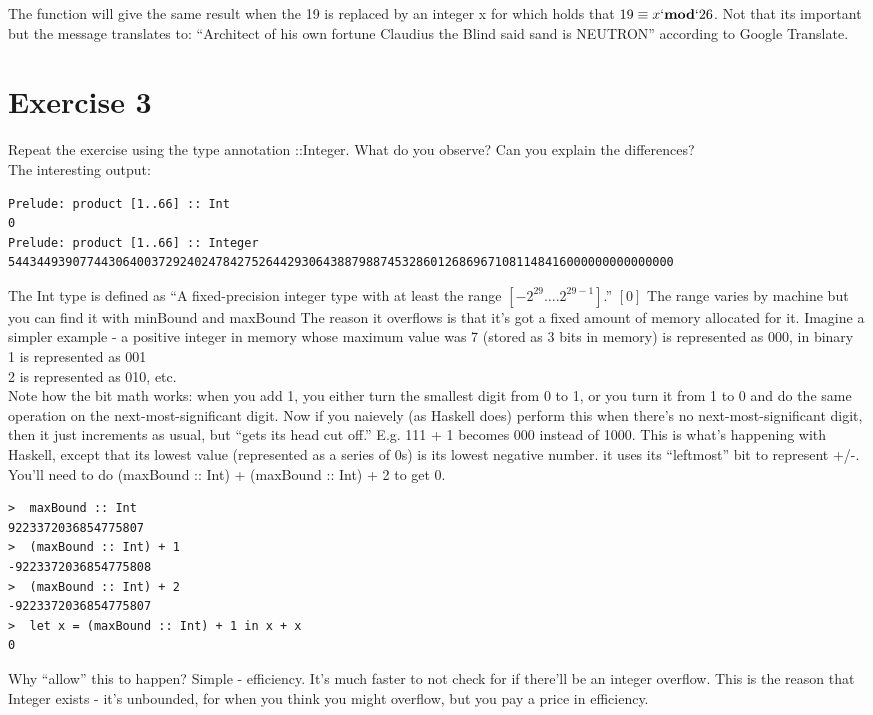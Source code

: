\documentclass{article}
\begin{document}
The function will give the same result when the 19 is replaced by an integer x for which holds that $19 \equiv x `\textbf{mod}` 26$.
\newline
\newline
Not that its important but the message translates to: ``Architect of his own fortune Claudius the Blind said sand is NEUTRON'' according to Google Translate.

\newpage
\section*{Exercise 3}
Repeat the exercise using the type annotation ::Integer. What do you observe? Can you explain the differences?\\
\newline
The interesting output:
\begin{lstlisting}
Prelude: product [1..66] :: Int
0
Prelude: product [1..66] :: Integer
544344939077443064003729240247842752644293064388798874532860126869671081148416000000000000000
\end{lstlisting}
The Int type is defined as ``A fixed-precision integer type with at least the range $[-2^{29} \dots. 2^{29-1}]$.'' $[0]$ The range varies by machine but you can find it with minBound and maxBound
\newline
The reason it overflows is that it's got a fixed amount of memory allocated for it. Imagine a simpler example - a positive integer in memory whose maximum value was 7 (stored as 3 bits in memory)
\newline
{} is represented as 000, in binary\\
1 is represented as 001\\
2 is represented as 010, etc.\\
\newline
Note how the bit math works: when you add 1, you either turn the smallest digit from 0 to 1, or you turn it from 1 to 0 and do the same operation on the next-most-significant digit.
\newline
\newline
Now if you naievely (as Haskell does) perform this when there's no next-most-significant digit, then it just increments as usual, but ``gets its head cut off.'' E.g. 111 + 1 becomes 000 instead of 1000. This is what's happening with Haskell, except that its lowest value (represented as a series of 0s) is its lowest negative number. it uses its ``leftmost'' bit to represent +/-. You'll need to do (maxBound :: Int) + (maxBound :: Int) + 2 to get 0.
\begin{lstlisting}
>  maxBound :: Int
9223372036854775807
>  (maxBound :: Int) + 1
-9223372036854775808
>  (maxBound :: Int) + 2
-9223372036854775807
>  let x = (maxBound :: Int) + 1 in x + x
0
\end{lstlisting}
Why ``allow'' this to happen? Simple - efficiency. It's much faster to not check for if there'll be an integer overflow. This is the reason that Integer exists - it's unbounded, for when you think you might overflow, but you pay a price in efficiency.
\end{document}
